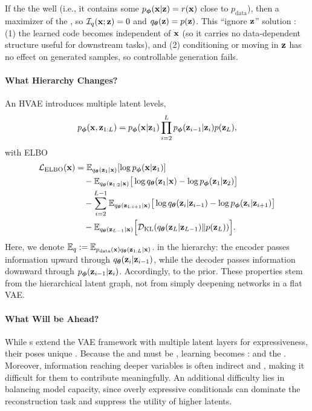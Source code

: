 If the  the  well  (i.e., it contains some $p_{\bm{\phi}}({\mathbf{x}}|{\mathbf{z}})=r({\mathbf{x}})$ close to $p_{\mathrm{data}}$), then a maximizer of the  , so $\mathcal I_q({\mathbf{x}};{\mathbf{z}})=0$ and $q_{\bm{\theta}}({\mathbf{z}})=p({\mathbf{z}})$. This ``ignore ${\mathbf{z}}$'' solution : (1) the learned code becomes independent of ${\mathbf{x}}$ (so it carries no data-dependent structure useful for downstream tasks), and (2) conditioning or moving in ${\mathbf{z}}$ has no effect on generated samples, so controllable generation fails.


\paragraph{What Hierarchy Changes?}
An HVAE introduces multiple latent levels,
\[
p_{\bm{\phi}}({\mathbf{x}},{\mathbf{z}}_{1:L})=p_{\bm{\phi}}({\mathbf{x}}|{\mathbf{z}}_1)\prod_{i=2}^L p_{\bm{\phi}}({\mathbf{z}}_{i-1}|{\mathbf{z}}_i) p({\mathbf{z}}_L),
\]
with ELBO
\begin{align*}
\mathcal L_{\mathrm{ELBO}}({\mathbf{x}})
&= \mathbb{E}_{q_{\bm{\theta}}({\mathbf{z}}_1|{\mathbf{x}})}[\log p_{\bm{\phi}}({\mathbf{x}}|{\mathbf{z}}_1)]
\\
&\quad - \mathbb{E}_{q_{\bm{\theta}}({\mathbf{z}}_{1:2}|{\mathbf{x}})}
\big[\log q_{\bm{\theta}}({\mathbf{z}}_1|{\mathbf{x}})-\log p_{\bm{\phi}}({\mathbf{z}}_1|{\mathbf{z}}_2)\big]
\\
&\quad - \sum_{i=2}^{L-1}
\mathbb{E}_{q_{\bm{\theta}}({\mathbf{z}}_{1:i+1}|{\mathbf{x}})}
\big[\log q_{\bm{\theta}}({\mathbf{z}}_i|{\mathbf{z}}_{i-1})-\log p_{\bm{\phi}}({\mathbf{z}}_i|{\mathbf{z}}_{i+1})\big]
\\
&\quad - \mathbb{E}_{q_{\bm{\theta}}({\mathbf{z}}_{L-1}|{\mathbf{x}})}
\Big[\mathcal{D}_{\mathrm{KL}}(q_{\bm{\theta}}({\mathbf{z}}_L|{\mathbf{z}}_{L-1}) \| p({\mathbf{z}}_L))\Big].
\end{align*}
Here, we denote $\mathbb{E}_q := \mathbb{E}_{p_{\mathrm{data}}({\mathbf{x}}) q_{{\bm{\theta}}}({\mathbf{z}}_{1:L}|{\mathbf{x}})}$.
 in the
hierarchy: the encoder passes information upward through
$q_{\bm{\theta}}({\mathbf{z}}_i|{\mathbf{z}}_{i-1})$, while the decoder passes information
downward through $p_{\bm{\phi}}({\mathbf{z}}_{i-1}|{\mathbf{z}}_i)$. Accordingly,  to the prior. These properties stem from
the hierarchical latent graph, not from simply deepening networks in a
flat VAE.

\paragraph{What Will be Ahead?}
While s extend the VAE framework with multiple latent layers for expressiveness, their  poses unique . Because the  and  must be , learning becomes :  and the . Moreover,  information reaching deeper variables is often indirect and , making it difficult for them to contribute meaningfully. An additional difficulty lies in balancing model capacity, since overly expressive conditionals  can dominate the reconstruction task and suppress the utility of higher latents. 


